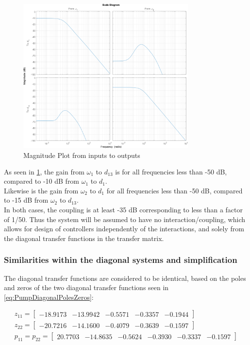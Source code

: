\begin{figure}[h!]
	\centering
		\includegraphics[width=0.8\textwidth]{Pictures/PumpMagPlot.png}
		
		\caption{Magnitude Plot from inputs to outputs}
	\label{fig:PumpMagPlot}
\end{figure}

As seen in \cref{fig:PumpMagPlot}, the gain from $\omega_1$ to $d_{13}$ is for all frequencies less than -50 dB, compared to -10 dB from $\omega_1$ to $d_1$. \\
Likewise is the gain from $\omega_2$ to $d_1$ for all frequencies less than -50 dB, compared to -15 dB from $\omega_2$ to $d_{13}$.\\
In both cases, the coupling is at least -35 dB corresponding to less than a factor of 1/50. Thus the system will be assumed to have no interaction/coupling, which allows for design of controllers independently of the interactions, and solely from the diagonal transfer functions in the transfer matrix.

\subsubsection{Similarities within the diagonal systems and simplification}
The diagonal transfer functions are considered to be identical, based on the poles and zeros of the two diagonal transfer functions seen in \cref{eq:PumpDiagonalPolesZeros}: 

\begin{equation}\label{eq:PumpDiagonalPolesZeros}
	\begin{gathered}
		z_{11} = \begin{bmatrix}-18.9173&  -13.9942&   -0.5571&   -0.3357&   -0.1944 \end{bmatrix} \\
		z_{22} = \begin{bmatrix}-20.7216&  -14.1600&   -0.4079&   -0.3639&   -0.1597 \end{bmatrix} \\
		p_{11} = p_{22} = \begin{bmatrix} 20.7703&  -14.8635&   -0.5624&   -0.3930&   -0.3337&   -0.1597 \end{bmatrix} \\
	\end{gathered}
\end{equation}

